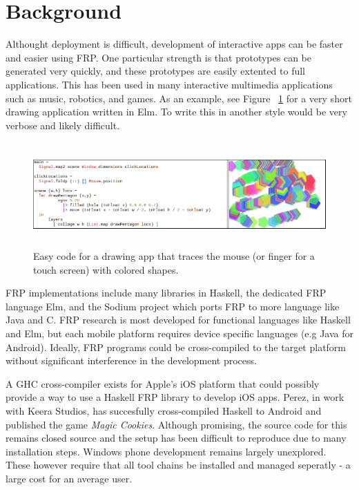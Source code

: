 \documentclass[preprint]{sigplanconf}
\begin{document}

\section{Background}
Althought deployment is difficult, development of interactive apps can be faster and easier using FRP.
One particular strength is that prototypes can be generated very quickly, and these prototypes are easily extented to full applications.
This has been used in many interactive multimedia applications such as music, robotics, and games\cite{euterpea,robots,yampa}.
As an example, see Figure ~\ref{fig:easy} for a very short drawing application written in Elm.
To write this in another style would be very verbose and likely difficult.

\begin{figure}
  \includegraphics[width=\textwidth,height=4cm]{easy.png}
  \caption{Easy code for a drawing app that traces the mouse (or finger for a touch screen) with colored shapes.}
  \label{fig:easy}
\end{figure}

FRP implementations include many libraries in Haskell, the dedicated FRP language Elm, and the Sodium project which ports FRP to more language like Java and C\cite{euterpea,elm,sodium}.
FRP research is most developed for functional languages like Haskell and Elm, but each mobile platform requires device specific languages (e.g Java for Android).
Ideally, FRP programs could be cross-compiled to the target platform without significant interference in the development process.


A GHC cross-compiler exists for Apple's iOS platform that could possibly provide a way to use a Haskell FRP library to develop iOS apps.
Perez, in work with Keera Studios, has succesfully cross-compiled Haskell to Android and published the game \textit{Magic Cookies}\cite{cookies}.
Although promising, the source code for this remains closed source and the setup has been difficult to reproduce due to many installation steps.
Windows phone development remains largely unexplored.
These however require that all tool chains be installed and managed seperatly - a large cost for an average user.
\end{document}
